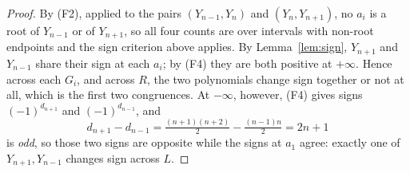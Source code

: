\documentclass[11pt]{amsart}
\theoremstyle{definition}
\begin{document}
\begin{proof}
By (F2), applied to the pairs $(Y_{n-1},Y_n)$ and $(Y_n,Y_{n+1})$, no $a_i$ is a
root of $Y_{n-1}$ or of $Y_{n+1}$, so all four counts are over intervals with
non-root endpoints and the sign criterion above applies. By
Lemma~\ref{lem:sign}, $Y_{n+1}$ and $Y_{n-1}$ share their sign at each $a_i$;
by (F4) they are both positive at $+\infty$. Hence across each $G_i$, and
across $R$, the two polynomials change sign together or not at all, which is the
first two congruences. At $-\infty$, however, (F4) gives signs $(-1)^{d_{n+1}}$
and $(-1)^{d_{n-1}}$, and
\[
 d_{n+1}-d_{n-1}=\tfrac{(n+1)(n+2)}{2}-\tfrac{(n-1)n}{2}=2n+1
\]
is \emph{odd}, so those two signs are opposite while the signs at $a_1$ agree:
exactly one of $Y_{n+1},Y_{n-1}$ changes sign across $L$.
\end{proof}
\end{document}
